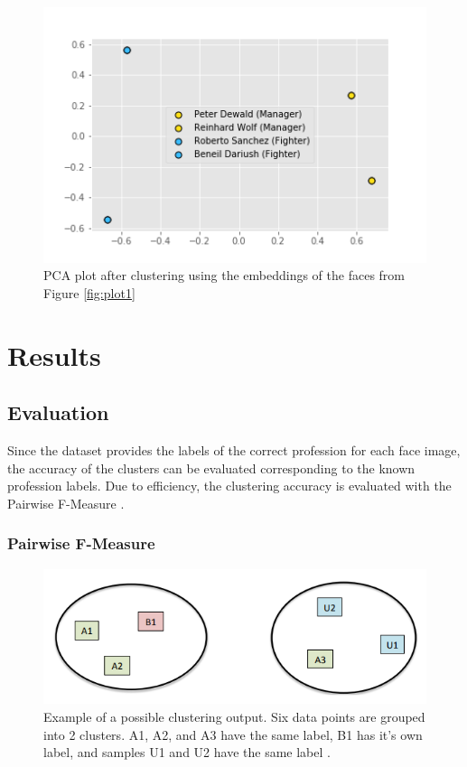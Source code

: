 \documentclass[12pt,english]{article}
\begin{document}
\begin{figure}[H]
\begin{minipage}[b]{0.6\textwidth}
    \includegraphics[width=\textwidth]{figures/plot.png}
    \caption{PCA plot after clustering using the embeddings of the faces from Figure \ref{fig:plot1}}
    \label{fig:plot2}
  \end{minipage}
\end{figure}

\section{Results}

\subsection{Evaluation}
\quad
Since the dataset provides the labels of the correct profession for each face image, the accuracy of the clusters can be evaluated corresponding to the known profession labels. Due to efficiency, the clustering accuracy is evaluated with the Pairwise F-Measure \cite{otto}.

\subsubsection{Pairwise F-Measure}

\begin{figure}[!tbp]
 \centering
    \includegraphics[width=\columnwidth]{figures/fmeasure.png}
    \caption{Example of a possible clustering output. Six data points are grouped into 2 clusters. A1, A2, and A3 have the same label, B1 has it's own label, and samples U1 and U2 have the same label \cite{otto}.}
    \label{fig:fmeasure}
\end{figure}
\end{document}
